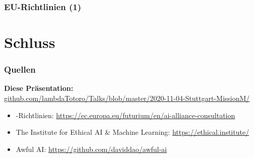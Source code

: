\documentclass[aspectratio=169,xcolor=dvipsnames]{beamer}
\begin{document}
\begin{frame}
\frametitle{\emojieu EU-Richtlinien (1)}
\end{frame}

\section{Schluss}



\begin{frame}
\frametitle{Quellen}
\small
\begin{center}
\textbf{Diese Präsentation:}\\
\url{github.com/lambdaTotoro/Talks/blob/master/2020-11-04-Stuttgart-MissionM/}
\end{center}
\bigskip

\begin{itemize}
\item \emojieu -Richtlinien: \url{https://ec.europa.eu/futurium/en/ai-alliance-consultation}
\item The Institute for Ethical AI \& Machine Learning: \url{https://ethical.institute/}
\item Awful AI: \url{https://github.com/daviddao/awful-ai}
\end{itemize}
\end{frame}
\end{document}
